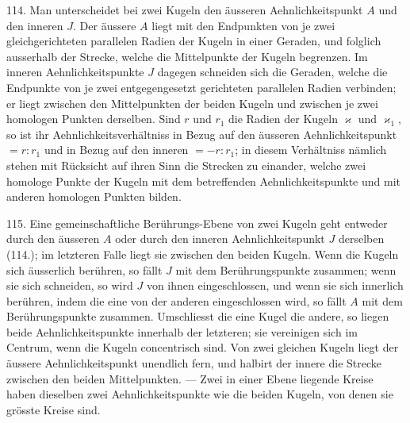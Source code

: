 114. Man unterscheidet bei zwei Kugeln den \"ausseren
Aehnlichkeitspunkt $A$ und den inneren $J$. Der \"aussere $A$
liegt mit den Endpunkten von je zwei gleichgerichteten
parallelen Radien der Kugeln in einer Geraden, und folglich
ausserhalb der Strecke, welche die Mittelpunkte der Kugeln
begrenzen.  Im inneren Aehnlichkeitspunkte $J$ dagegen
schneiden sich die Geraden, welche die Endpunkte von je
zwei entgegengesetzt gerichteten parallelen Radien verbinden;
er liegt zwischen den Mittelpunkten der beiden Kugeln und
zwischen je zwei homologen Punkten derselben. Sind $r$ und
$r_1$ die Radien der Kugeln $\varkappa$ und $\varkappa_1$, so ist ihr
Aehnlichkeitsverh\"altniss in Bezug auf den \"ausseren Aehnlichkeitspunkt
$= r : r_1$ und in Bezug auf den inneren $= - r : r_1$; in diesem
Verh\"altniss n\"amlich stehen mit R\"ucksicht auf ihren Sinn die
Strecken zu einander, welche zwei homologe Punkte der
Kugeln mit dem betreffenden Aehnlichkeitspunkte und mit
anderen homologen Punkten bilden.

115. Eine gemeinschaftliche Ber\"uhrungs-Ebene von zwei
Kugeln geht entweder durch den \"ausseren $A$ oder durch den
inneren Aehnlichkeitspunkt $J$ derselben (114.); im letzteren
Falle liegt sie zwischen den beiden Kugeln. Wenn die Kugeln
sich \"ausserlich ber\"uhren, so f\"allt $J$ mit dem Ber\"uh\-rungs\-punkte
zusammen; wenn sie sich schneiden, so wird $J$ von
ihnen eingeschlossen, und wenn sie sich innerlich ber\"uhren,
indem die eine von der anderen eingeschlossen wird, so f\"allt
$A$ mit dem Ber\"uhrungspunkte zusammen. Umschliesst die
eine Kugel die andere, so liegen beide Aehnlichkeitspunkte
innerhalb der letzteren; sie vereinigen sich im Centrum, wenn
die Kugeln concentrisch sind. Von zwei gleichen Kugeln
liegt der \"aussere Aehnlichkeitspunkt unendlich fern, und
halbirt der innere die Strecke zwischen den beiden
Mittelpunkten. --- Zwei in einer Ebene liegende Kreise haben dieselben
zwei Aehnlichkeitspunkte wie die beiden Kugeln, von
denen sie gr\"osste Kreise sind.

